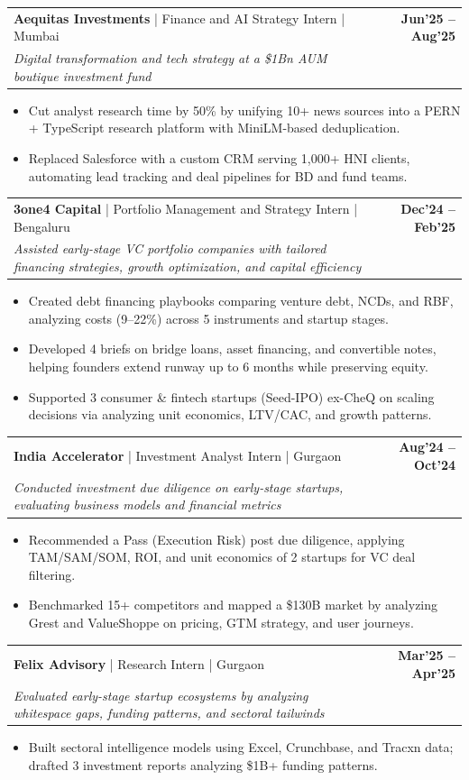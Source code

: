 \documentclass[10pt, a4paper]{article}
\makeatletter
\newcommand{\jobheader}[4]{
  \vspace{-1pt}
  \begin{tabular*}{\textwidth}[t]{l@{\extracolsep{\fill}}r}
    \textbf{#1} \quad | \quad #3 & \textbf{\small #4} \\
    \textit{\small #2} & \\
  \end{tabular*}
  \vspace{-2pt}
}
\newenvironment{achievelist}{
  \begin{itemize}[leftmargin=1.2em, itemsep=0.5pt, parsep=0pt, topsep=1pt]
    \small
}{
  \end{itemize}
  \vspace{-2pt}
}
\newcommand{\achieve}[1]{\item #1}
\makeatother
\begin{document}
\jobheader{Aequitas Investments}{Digital transformation and tech strategy at a \$1Bn AUM boutique investment fund}{Finance and AI Strategy Intern | Mumbai}{Jun'25 -- Aug'25}
\begin{achievelist}
  \achieve{Cut analyst research time by 50\% by unifying 10+ news sources into a PERN + TypeScript research platform with MiniLM-based deduplication.}
  \achieve{Replaced Salesforce with a custom CRM serving 1,000+ HNI clients, automating lead tracking and deal pipelines for BD and fund teams.}
\end{achievelist}

\jobheader{3one4 Capital}{Assisted early-stage VC portfolio companies with tailored financing strategies, growth optimization, and capital efficiency}{Portfolio Management and Strategy Intern | Bengaluru}{Dec'24 -- Feb'25}
\begin{achievelist}
  \achieve{Created debt financing playbooks comparing venture debt, NCDs, and RBF, analyzing costs (9--22\%) across 5 instruments and startup stages.}
  \achieve{Developed 4 briefs on bridge loans, asset financing, and convertible notes, helping founders extend runway up to 6 months while preserving equity.}
  \achieve{Supported 3 consumer \& fintech startups (Seed-IPO) ex-CheQ on scaling decisions via analyzing unit economics, LTV/CAC, and growth patterns.}
\end{achievelist}

\jobheader{India Accelerator}{Conducted investment due diligence on early-stage startups, evaluating business models and financial metrics}{Investment Analyst Intern | Gurgaon}{Aug'24 -- Oct'24}
\begin{achievelist}
  \achieve{Recommended a Pass (Execution Risk) post due diligence, applying TAM/SAM/SOM, ROI, and unit economics of 2 startups for VC deal filtering.}
  \achieve{Benchmarked 15+ competitors and mapped a \$130B market by analyzing Grest and ValueShoppe on pricing, GTM strategy, and user journeys.}
\end{achievelist}

\jobheader{Felix Advisory}{Evaluated early-stage startup ecosystems by analyzing whitespace gaps, funding patterns, and sectoral tailwinds}{Research Intern | Gurgaon}{Mar'25 -- Apr'25}
\begin{achievelist}
  \achieve{Built sectoral intelligence models using Excel, Crunchbase, and Tracxn data; drafted 3 investment reports analyzing \$1B+ funding patterns.}
\end{achievelist}
\end{document}

